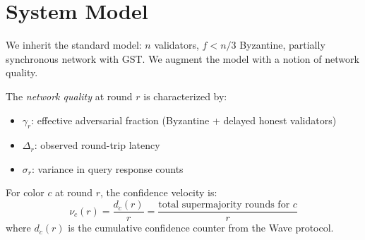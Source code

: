\section{System Model}

\label{sec:model}

We inherit the standard model: $n$ validators, $f < n/3$ Byzantine, partially
synchronous network with GST. We augment the model with a notion of network quality.

\begin{definition}
The \emph{network quality} at round $r$ is characterized by:
\begin{itemize}[nosep]
\item $\gamma_r$: effective adversarial fraction (Byzantine + delayed honest validators)
\item $\Delta_r$: observed round-trip latency
\item $\sigma_r$: variance in query response counts
\end{itemize}
\end{definition}

\begin{definition}
For color $c$ at round $r$, the confidence velocity is:
\[
\nu_c(r) = \frac{d_c(r)}{r} = \frac{\text{total supermajority rounds for } c}{r}
\]
where $d_c(r)$ is the cumulative confidence counter from the Wave protocol.
\end{definition}

